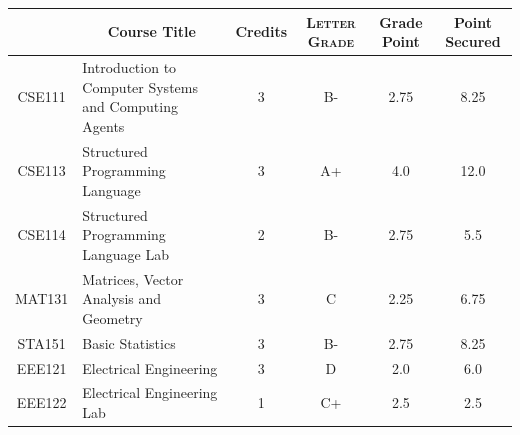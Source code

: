 \documentclass[11pt]{article}
\newcommand*{\numtwo}[1]{\pgfmathprintnumber[
                    fixed, precision=2, fixed zerofill=true]{#1}}
\begin{document}
                \begin{center}
                    \renewcommand{\arraystretch}{1.08}
                    
                \begin{tabular}{|c|l|c|>{\scshape}c|c|c|}
                \hline  \rule[-1ex]{0pt}{3.5ex} {\centering{\bf Course Code}} &  \multicolumn{1}{c|}{\textbf{Course Title}}  & {\bf Credits} & {\bf Letter Grade} & {\bf Grade Point} & {\bf Point Secured}  \\ 
                \hline   CSE111 &  Introduction to Computer Systems and Computing Agents		 & 3 & B- & 2.75 & 8.25 \\ %
                \hline   CSE113 &  Structured Programming Language		 & 3 & A+ & 4.0 & 12.0 \\ %
                \hline   CSE114 &  Structured Programming Language Lab		 & 2 & B- & 2.75 & 5.5 \\ %
                \hline   MAT131 &  Matrices, Vector Analysis and Geometry		 & 3 & C & 2.25 & 6.75 \\ %
                \hline   STA151 &  Basic Statistics		 & 3 & B- & 2.75 & 8.25 \\ %
                \hline   EEE121 &  Electrical Engineering		 & 3 & D & 2.0 & 6.0 \\ %
                \hline   EEE122 &  Electrical Engineering Lab		 & 1 & C+ & 2.5 & 2.5 \\ %

\hline                %
                \end{tabular}
                \end{center}
                \renewcommand{\arraystretch}{1.03}
\end{document}
